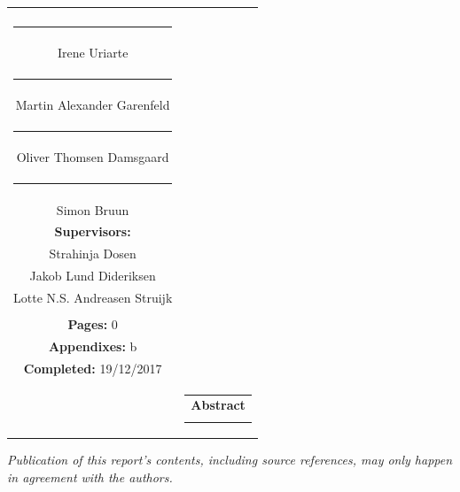 \begin{titlepage}
\begin{nopagebreak}
{\begin{tabular}{cc}
{{\textbf{Collaborators:}\\
\rule{5cm}{1pt}\\
Irene Uriarte \\
\rule{5cm}{1pt}\\
Martin Alexander Garenfeld \\
\rule{5cm}{1pt}\\
Oliver Thomsen Damsgaard \\
\rule{5cm}{1pt}\\
Simon Bruun \\

\textbf{Supervisors:}\\
Strahinja Dosen \\
Jakob Lund Dideriksen \\
Lotte N.S. Andreasen Struijk \\
}\\


\textbf{Pages:} 0\\
\textbf{Appendixes:} b \\
\textbf{Completed:} 19/12/2017\\

\vfill } &
\parbox{7cm}{
  \vspace{.15cm}
  \hfill
  \begin{tabular}{l}
  {\textbf{Abstract}}\bigskip \\
  \fbox{
    \parbox{6.5cm}{\bigskip
     {\vfill{\small 
     \bigskip}}
     }}
   \end{tabular}}
\end{tabular}} %


\centering
\textit{Publication of this report's contents, including source references, may only happen in agreement with the authors.}\\


\end{nopagebreak}
\end{titlepage}
%